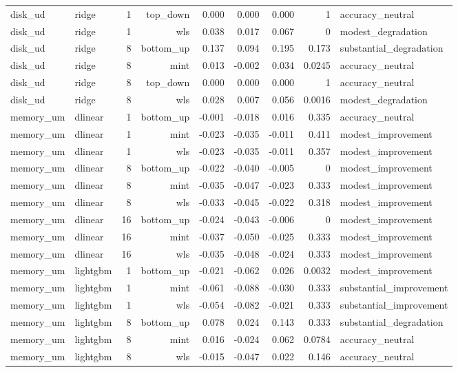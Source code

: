 \begin{tabular}{llrrrrrrl}
disk_ud & ridge & 1 & top_down & 0.000 & 0.000 & 0.000 & 1 & accuracy_neutral \\
disk_ud & ridge & 1 & wls & 0.038 & 0.017 & 0.067 & 0 & modest_degradation \\
disk_ud & ridge & 8 & bottom_up & 0.137 & 0.094 & 0.195 & 0.173 & substantial_degradation \\
disk_ud & ridge & 8 & mint & 0.013 & -0.002 & 0.034 & 0.0245 & accuracy_neutral \\
disk_ud & ridge & 8 & top_down & 0.000 & 0.000 & 0.000 & 1 & accuracy_neutral \\
disk_ud & ridge & 8 & wls & 0.028 & 0.007 & 0.056 & 0.0016 & modest_degradation \\
memory_um & dlinear & 1 & bottom_up & -0.001 & -0.018 & 0.016 & 0.335 & accuracy_neutral \\
memory_um & dlinear & 1 & mint & -0.023 & -0.035 & -0.011 & 0.411 & modest_improvement \\
memory_um & dlinear & 1 & wls & -0.023 & -0.035 & -0.011 & 0.357 & modest_improvement \\
memory_um & dlinear & 8 & bottom_up & -0.022 & -0.040 & -0.005 & 0 & modest_improvement \\
memory_um & dlinear & 8 & mint & -0.035 & -0.047 & -0.023 & 0.333 & modest_improvement \\
memory_um & dlinear & 8 & wls & -0.033 & -0.045 & -0.022 & 0.318 & modest_improvement \\
memory_um & dlinear & 16 & bottom_up & -0.024 & -0.043 & -0.006 & 0 & modest_improvement \\
memory_um & dlinear & 16 & mint & -0.037 & -0.050 & -0.025 & 0.333 & modest_improvement \\
memory_um & dlinear & 16 & wls & -0.035 & -0.048 & -0.024 & 0.333 & modest_improvement \\
memory_um & lightgbm & 1 & bottom_up & -0.021 & -0.062 & 0.026 & 0.0032 & modest_improvement \\
memory_um & lightgbm & 1 & mint & -0.061 & -0.088 & -0.030 & 0.333 & substantial_improvement \\
memory_um & lightgbm & 1 & wls & -0.054 & -0.082 & -0.021 & 0.333 & substantial_improvement \\
memory_um & lightgbm & 8 & bottom_up & 0.078 & 0.024 & 0.143 & 0.333 & substantial_degradation \\
memory_um & lightgbm & 8 & mint & 0.016 & -0.024 & 0.062 & 0.0784 & accuracy_neutral \\
memory_um & lightgbm & 8 & wls & -0.015 & -0.047 & 0.022 & 0.146 & accuracy_neutral \\

\end{tabular}
